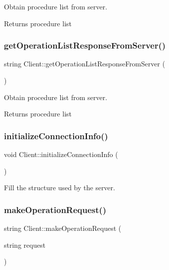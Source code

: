 Obtain procedure list from server. \begin{DoxyReturn}{Returns}
procedure list 
\end{DoxyReturn}
\mbox{\label{classClient_ad35a8d75c474438e4badb63a203b9b47}} 
\subsubsection{\texorpdfstring{get\+Operation\+List\+Response\+From\+Server()}{getOperationListResponseFromServer()}}
{\footnotesize\ttfamily string Client\+::get\+Operation\+List\+Response\+From\+Server (\begin{DoxyParamCaption}{ }\end{DoxyParamCaption})\hspace{0.3cm}{\ttfamily [private]}}

Obtain procedure list from server. \begin{DoxyReturn}{Returns}
procedure list 
\end{DoxyReturn}
\mbox{\label{classClient_a19174bbc66616854e59df496419e97e8}} 
\subsubsection{\texorpdfstring{initialize\+Connection\+Info()}{initializeConnectionInfo()}}
{\footnotesize\ttfamily void Client\+::initialize\+Connection\+Info (\begin{DoxyParamCaption}{ }\end{DoxyParamCaption})\hspace{0.3cm}{\ttfamily [private]}}

Fill the structure used by the server. \mbox{\label{classClient_a4b3fb068e167dae862670c1c71c8bf4f}} 
\subsubsection{\texorpdfstring{make\+Operation\+Request()}{makeOperationRequest()}}
{\footnotesize\ttfamily string Client\+::make\+Operation\+Request (\begin{DoxyParamCaption}\item[{string}]{request }\end{DoxyParamCaption})}

